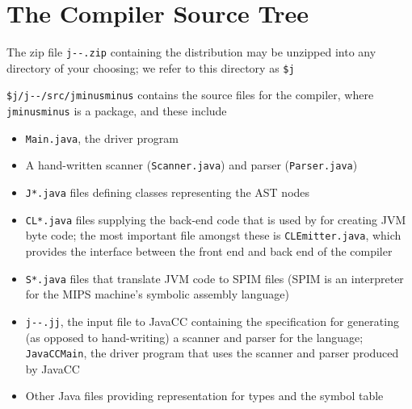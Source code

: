 \documentclass[8pt,a4paper,compress]{beamer}
\begin{document}
\section{The \protect \jmm Compiler Source Tree}
\begin{frame}[fragile]
\pause

The zip file \lstinline{j--.zip} containing the \jmm distribution may be unzipped into any directory of your choosing; we refer to this directory as \lstinline{$j}

\pause
\bigskip

\lstinline{$j/j--/src/jminusminus} contains the source files for the compiler, where \lstinline{jminusminus} is a package, and these include
\begin{itemize}
\item \lstinline{Main.java}, the driver program
\item A hand-written scanner (\lstinline{Scanner.java}) and parser (\lstinline{Parser.java})
\item \lstinline{J*.java} files defining classes representing the AST nodes
\item \lstinline{CL*.java} files supplying the back-end code that is used by \jmm for creating JVM byte
code; the most important file amongst these is \lstinline{CLEmitter.java}, which provides the interface between the front end and back end of the compiler
\item \lstinline{S*.java} files that translate JVM code to SPIM files (SPIM is an interpreter for the
MIPS machine’s symbolic assembly language)
\item \lstinline{j--.jj}, the input file to JavaCC containing the specification for generating (as opposed to hand-writing) a scanner and parser for the \jmm language; \lstinline{JavaCCMain}, the driver program that uses the scanner and parser produced by JavaCC
\item Other Java files providing representation for types and the symbol table
\end{itemize}
\end{frame}
\end{document}
